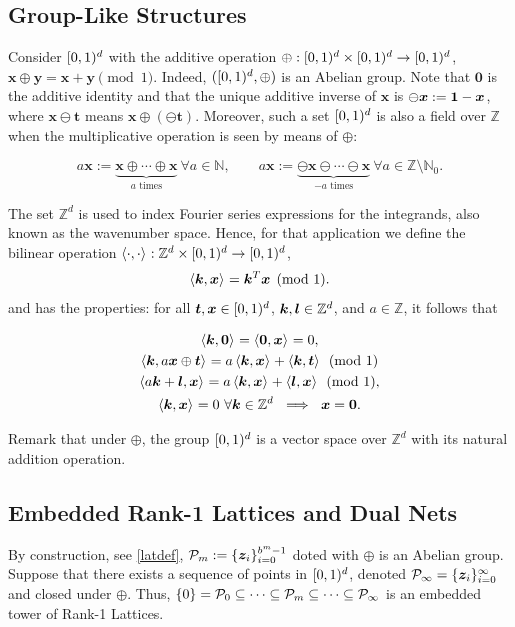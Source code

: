 \documentclass[graybox]{svmult}
\newcommand{\Z}{\mathbb{Z}} %
\newcommand{\N}{\mathbb{N}} %
\newcommand{\bszero}{\boldsymbol{0}} %
\newcommand{\bst}{\boldsymbol{t}}    %
\newcommand{\bsx}{\boldsymbol{x}}    %
\newcommand{\bsy}{\boldsymbol{y}}    %
\newcommand{\bsz}{\boldsymbol{z}}    %
\begin{document}
\subsection{Group-Like Structures}
Consider $[0,1)^d$ with the additive operation $\oplus:[0,1)^d \times [0,1)^d \to [0,1)^d$, $\bsx\oplus\bsy=\bsx+\bsy\pmod 1$. Indeed, $([0,1)^d,\oplus)$ is an Abelian group. Note that $\bszero$ is the additive identity and that the unique additive inverse of $\bsx$ is $\ominus \bsx:=\bold{1}-\bsx$, where $\bsx \ominus \bst$ means $\bsx \oplus (\ominus \bst)$. Moreover, such a set $[0,1)^d$ is also a field over $\Z$ when the multiplicative operation is seen by means of $\oplus$:

\[
a \bsx:=\underbrace{\bsx \oplus \cdots \oplus \bsx}_{a \text{ times}}\ \forall a \in \N, \qquad a \bsx:=\underbrace{\ominus\bsx \ominus \cdots \ominus \bsx}_{-a \text{ times}}\ \forall a \in \Z\setminus\N_0.
\]
 
The set $\Z^d$ is used to index Fourier series expressions for the integrands, also known as the wavenumber space. Hence, for that application we define the bilinear operation $\ip{\cdot}{\cdot}: \Z^d \times \cube \to \cube$, 
\begin{equation}\label{bilinear}
\ip{\bsk}{\bsx}=\bsk^T\bsx\pmod 1.
\end{equation}
and has the properties: for all $\bst, \bsx \in \cube$, $\bsk, \bsl \in \Z^d$, and $a \in \Z$, it follows that

\begin{subequations}
\begin{gather}
\ip{\bsk}{\bszero} = \ip{\bszero}{\bsx} = 0,\\
\ip{\bsk}{a \bsx \oplus \bst} = a\ip{\bsk}{\bsx} + \ip{\bsk}{\bst} \pmod 1 \label{bilinearlinxprop} \\
\ip{a \bsk + \bsl}{\bsx} = a\ip{\bsk}{\bsx} + \ip{\bsl}{\bsx} \pmod 1, \label{bilinearlinkprop}\\
\ip{\bsk}{\bsx} = 0 \ \forall \bsk \in \Z^d \ \implies \ \bsx=\bszero.\label{bilinearlinzeroprop}
\end{gather}
\end{subequations}

Remark that under $\oplus$, the group $[0,1)^d$ is a vector space over $\Z^d$ with its natural addition operation.

\subsection{Embedded Rank-1 Lattices and Dual Nets}
By construction, see \eqref{latdef}, $\cp_m := \{\bsz_i\}_{i=0}^{b^m-1}$ doted with $\oplus$ is an Abelian group. Suppose that there exists a sequence of points in $[0,1)^d$, denoted $\cp_\infty =\{\bsz_i\}_{i=0}^{\infty}$ and closed under $\oplus$. Thus, $\{0\}=\mathcal{P}_0\subseteq\dots\subseteq\mathcal{P}_m\subseteq\dots\subseteq\mathcal{P}_\infty$ is an embedded tower of Rank-1 Lattices.
\end{document}
